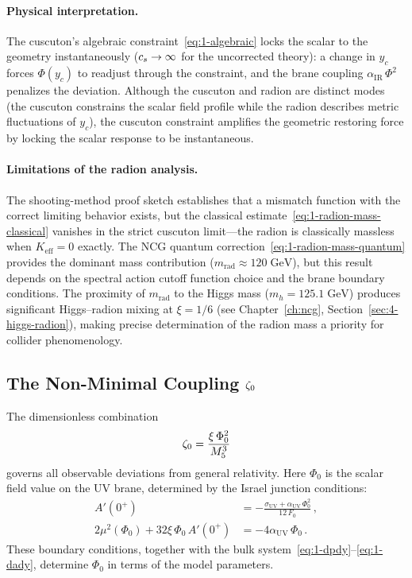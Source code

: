 \paragraph{Physical interpretation.} The cuscuton's algebraic constraint~\eqref{eq:1-algebraic} locks the scalar to the geometry instantaneously ($c_s \to \infty$ for the uncorrected theory): a change in $y_c$ forces $\Phi(y_c)$ to readjust through the constraint, and the brane coupling $\alpha_{\mathrm{IR}}\,\Phi^2$ penalizes the deviation. Although the cuscuton and radion are distinct modes (the cuscuton constrains the scalar field profile while the radion describes metric fluctuations of $y_c$), the cuscuton constraint amplifies the geometric restoring force by locking the scalar response to be instantaneous.

\paragraph{Limitations of the radion analysis.} The shooting-method proof sketch establishes that a mismatch function with the correct limiting behavior exists, but the classical estimate~\eqref{eq:1-radion-mass-classical} vanishes in the strict cuscuton limit---the radion is classically massless when $K_{\mathrm{eff}} = 0$ exactly. The NCG quantum correction~\eqref{eq:1-radion-mass-quantum} provides the dominant mass contribution ($m_{\mathrm{rad}} \approx 120\;\mathrm{GeV}$), but this result depends on the spectral action cutoff function choice and the brane boundary conditions. The proximity of $m_{\mathrm{rad}}$ to the Higgs mass ($m_h = 125.1\;\mathrm{GeV}$) produces significant Higgs--radion mixing at $\xi = 1/6$ (see Chapter~\ref{ch:ncg}, Section~\ref{sec:4-higgs-radion}), making precise determination of the radion mass a priority for collider phenomenology.

\subsection{The Non-Minimal Coupling \texorpdfstring{$\zeta_0$}{zeta\_0}}
\label{sec:1-zeta}

The dimensionless combination
\begin{equation}
\label{eq:1-zeta}
\zeta_0 = \frac{\xi\,\Phi_0^2}{M_5^3}
\end{equation}
governs all observable deviations from general relativity. Here $\Phi_0$ is the scalar field value on the UV brane, determined by the Israel junction conditions:
\begin{subequations}
\label{eq:1-junction}
\begin{align}
A'(0^+) &= -\frac{\sigma_{\mathrm{UV}} + \alpha_{\mathrm{UV}}\,\Phi_0^2}{12\, F_0}\,, \label{eq:1-junction-a}\\
2\mu^2(\Phi_0) + 32\xi\,\Phi_0\, A'(0^+) &= -4\alpha_{\mathrm{UV}}\,\Phi_0\,. \label{eq:1-junction-b}
\end{align}
\end{subequations}
These boundary conditions, together with the bulk system~\eqref{eq:1-dpdy}--\eqref{eq:1-dady}, determine $\Phi_0$ in terms of the model parameters.

